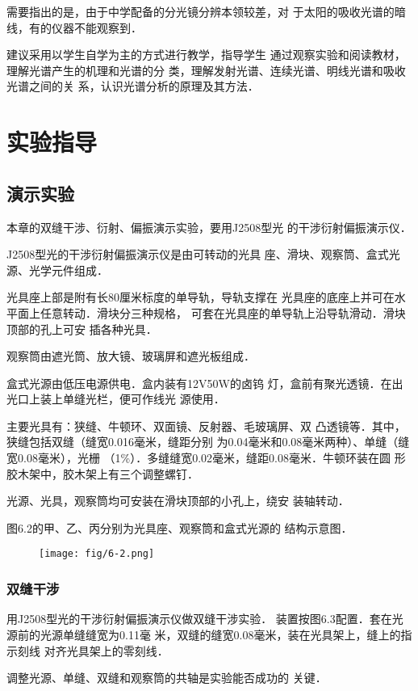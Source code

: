 需要指出的是，由于中学配备的分光镜分辨本领较差，对
于太阳的吸收光谱的暗线，有的仪器不能观察到．

建议采用以学生自学为主的方式进行教学，指导学生
通过观察实验和阅读教材，理解光谱产生的机理和光谱的分
类，理解发射光谱、连续光谱、明线光谱和吸收光谱之间的关
系，认识光谱分析的原理及其方法．

\section{实验指导}
\subsection{演示实验}
本章的双缝干涉、衍射、偏振演示实验，要用J2508型光
的干涉衍射偏振演示仪．

J2508型光的干涉衍射偏振演示仪是由可转动的光具
座、滑块、观察筒、盒式光源、光学元件组成．

光具座上部是附有长80厘米标度的单导轨，导轨支撑在
光具座的底座上并可在水平面上任意转动．滑块分三种规格，
可套在光具座的单导轨上沿导轨滑动．滑块顶部的孔上可安
插各种光具．

观察筒由遮光筒、放大镜、玻璃屏和遮光板组成．

盒式光源由低压电源供电．盒内装有12V50W的卤钨
灯，盒前有聚光透镜．在出光口上装上单缝光栏，便可作线光
源使用．

主要光具有：狭缝、牛顿环、双面镜、反射器、毛玻璃屏、双
凸透镜等．其中，狭缝包括双缝（缝宽0.016毫米，缝距分别
为0.04毫米和0.08毫米两种）、单缝（缝宽0.08毫米），光栅
（1\%）．多缝缝宽0.02毫米，缝距0.08毫米．牛顿环装在圆
形胶木架中，胶木架上有三个调整螺钉．

光源、光具，观察筒均可安装在滑块顶部的小孔上，绕安
装轴转动．

图6.2的甲、乙、丙分别为光具座、观察筒和盒式光源的
结构示意图．

\begin{figure}[htp]
    \centering
    \texttt{[image: fig/6-2.png]}
    \caption{}
\end{figure}

\subsubsection{双缝干涉}
用J2508型光的干涉衍射偏振演示仪做双缝干涉实验．
装置按图6.3配置．套在光源前的光源单缝缝宽为0.11毫
米，双缝的缝宽0.08毫米，装在光具架上，缝上的指示刻线
对齐光具架上的零刻线．

调整光源、单缝、双缝和观察筒的共轴是实验能否成功的
关键．

